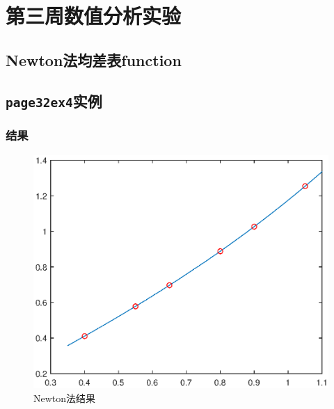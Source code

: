 \section{第三周数值分析实验}
\subsection{Newton法均差表function}

\subsection{\texttt{page32ex4}实例}

\subsubsection{结果}
\begin{figure}[H]
	\centering
	\includegraphics[width = 0.6\linewidth]{day3/newton.eps}
	\caption{Newton法结果}
\end{figure}

